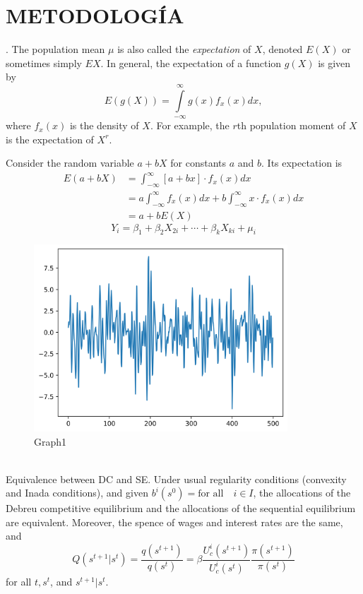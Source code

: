 \documentclass[12pt,a4paper]{article} %
\begin{document}
	\section{METODOLOGÍA}
		\lipsum[1-4]. 
		\newpage
		The population mean $\mu$ is also called the \textit{expectation}
		of $X$, denoted $E(X)$ or sometimes simply $EX$. In general,
		the expectation of a function $g(X)$ is given by
			\begin{equation}
				E\left(g\left(X\right)\right) =
				\int\limits_{-\infty}^{\infty}g(x)f_{x}(x)dx,
			\end{equation}
		where $f_{x}(x)$ is the density of $X$. For example, the $r$th population moment of $X$ is the expectation of $X^{r}$.
		
		Consider the random variable $ a + bX$ for constants $a$ and $b$.
		Its expectation is 
			\begin{equation}
				\begin{aligned}
					E\left(a+bX\right) &= \int_{-\infty}^{\infty}
					\left[a + bx\right]\cdot f_{x}(x)dx \\
					&= a\int_{-\infty}^{\infty}f_{x}(x)dx  + 
					b\int_{-\infty}^{\infty}x\cdot f_{x}(x)dx\\
					&= a + bE(X)
				\end{aligned}
			\end{equation}
		\lipsum[1]
		\begin{equation}\label{eq: MLG}
			Y_{i} = \beta_{1} + \beta_{2}X_{2i} + \cdots + \beta_{k}X_{ki} + \mu_{i}
		\end{equation}
		\lipsum[1]
		\begin{figure}[h]
			\centering
			\includegraphics[height=7cm]{Graph1.png}
			\caption{Graph1}
			\label{fig: Graph1}
		\end{figure}
		\lipsum[1] 
		\vspace{0.7cm}\\
		\textcolor{red!75}{Equivalence between DC and SE}. Under usual
		regularity conditions (convexity and Inada conditions), and given
		$b^{i}(s^{0}) = \text{for all} \quad i \in I$, the allocations of the Debreu
		competitive equilibrium and the allocations of the sequential equilibrium
		are equivalent. Moreover, the spence of wages and interest rates are the same, and
			\begin{equation}\label{eq: DC and SE}
				Q(s^{t+1}|s^{t}) = \frac{q(s^{t+1})}{q(s^{t})} =
				\beta \frac{U_{c}^{i}(s^{t+1})}{U_{c}^{i}(s^{t})} \frac{\pi(s^{t+1})}{\pi(s^{t})}
			\end{equation}
		for all $ t, s^{t}$, and $s^{t+1}|s^{t}$.
\end{document}
